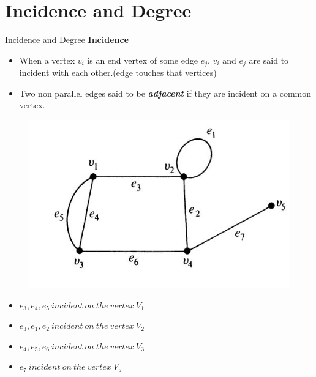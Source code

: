 \documentclass{beamer}
\begin{document}
\section{Incidence and Degree}
\begin{frame}{Incidence and Degree}
	\textbf{Incidence}
	\begin{itemize}
		\item When a vertex $v_i$ is an end vertex of some edge $e_j$, $v_i$ and $e_j$ are said to incident with each other.(edge touches that vertices) 
		\item Two non parallel edges said to be \textbf{\textit{adjacent}} if 
		they are incident on a common vertex.
	\end{itemize}
	\begin{figure}
	\includegraphics[scale=.5]{img/m17}
\end{figure}
\begin{itemize}
	\item $e_3,e_4,e_5 \ incident\  on\  the\  vertex\  V_1$
		\item $e_3,e_1,e_2 \ incident\  on\  the\  vertex\  V_2$
	\item $e_4,e_5,e_6 \ incident\  on\  the\  vertex\  V_3$
	\item $e_7 \ incident\  on\  the\  vertex\  V_5$
\end{itemize}
\end{frame}
\end{document}
